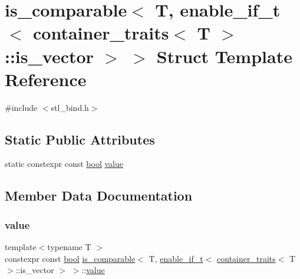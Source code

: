 \hypertarget{structis__comparable_3_01_t_00_01enable__if__t_3_01container__traits_3_01_t_01_4_1_1is__vector_01_4_01_4}{}\section{is\+\_\+comparable$<$ T, enable\+\_\+if\+\_\+t$<$ container\+\_\+traits$<$ T $>$\+::is\+\_\+vector $>$ $>$ Struct Template Reference}
\label{structis__comparable_3_01_t_00_01enable__if__t_3_01container__traits_3_01_t_01_4_1_1is__vector_01_4_01_4}


{\ttfamily \#include $<$stl\+\_\+bind.\+h$>$}

\subsection*{Static Public Attributes}
\begin{DoxyCompactItemize}
\item 
static constexpr const \mbox{\hyperlink{asdl_8h_af6a258d8f3ee5206d682d799316314b1}{bool}} \mbox{\hyperlink{structis__comparable_3_01_t_00_01enable__if__t_3_01container__traits_3_01_t_01_4_1_1is__vector_01_4_01_4_ad1e10c97b4685f0c86bcf18a3eb91079}{value}}
\end{DoxyCompactItemize}


\subsection{Member Data Documentation}
\mbox{\label{structis__comparable_3_01_t_00_01enable__if__t_3_01container__traits_3_01_t_01_4_1_1is__vector_01_4_01_4_ad1e10c97b4685f0c86bcf18a3eb91079}} 
\subsubsection{\texorpdfstring{value}{value}}
{\footnotesize\ttfamily template$<$typename T $>$ \\
constexpr const \mbox{\hyperlink{asdl_8h_af6a258d8f3ee5206d682d799316314b1}{bool}} \mbox{\hyperlink{structis__comparable}{is\+\_\+comparable}}$<$ T, \mbox{\hyperlink{detail_2common_8h_a012819c9e8b5e04872a271f50f8b8196}{enable\+\_\+if\+\_\+t}}$<$ \mbox{\hyperlink{structcontainer__traits}{container\+\_\+traits}}$<$ T $>$\+::is\+\_\+vector $>$ $>$\+::\mbox{\hyperlink{_s_d_l__opengl__glext_8h_a8ad81492d410ff2ac11f754f4042150f}{value}}\hspace{0.3cm}{\ttfamily [static]}}

